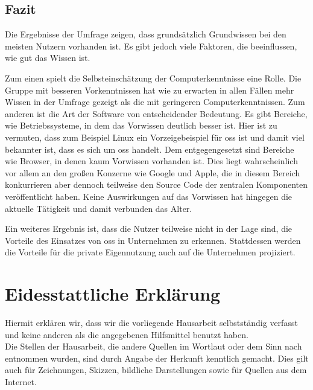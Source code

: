 \documentclass[a4paper]{article}
\begin{document}
        \subsection{Fazit}
            Die Ergebnisse der Umfrage zeigen, dass grundsätzlich Grundwissen bei den meisten Nutzern vorhanden ist. Es gibt jedoch viele Faktoren, die beeinflussen, wie gut das Wissen ist.
            
            Zum einen spielt die Selbsteinschätzung der Computerkenntnisse eine Rolle. Die Gruppe mit besseren Vorkenntnissen hat wie zu erwarten in allen Fällen mehr Wissen in der Umfrage gezeigt als die mit geringeren Computerkenntnissen.
            Zum anderen ist die Art der Software von entscheidender Bedeutung. Es gibt Bereiche, wie Betriebssysteme, in dem das Vorwissen deutlich besser ist. Hier ist zu vermuten, dass zum Beispiel Linux ein Vorzeigebeispiel für \gls{oss} ist und damit viel bekannter ist, dass es sich um \gls{oss} handelt. Dem entgegengesetzt sind Bereiche wie Browser, in denen kaum Vorwissen vorhanden ist. Dies liegt wahrscheinlich vor allem an den großen Konzerne wie Google und Apple, die in diesem Bereich konkurrieren aber dennoch teilweise den Source Code der zentralen Komponenten veröffentlicht haben.
            Keine Auswirkungen auf das Vorwissen hat hingegen die aktuelle Tätigkeit und damit verbunden das Alter.
            
            Ein weiteres Ergebnis ist, dass die Nutzer teilweise nicht in der Lage sind, die Vorteile des Einsatzes von \gls{oss} in Unternehmen zu erkennen. Stattdessen werden die Vorteile für die private Eigennutzung auch auf die Unternehmen projiziert.
                
    \clearpage
    \section{Eidesstattliche Erklärung}
        Hiermit erklären wir, dass wir die vorliegende Hausarbeit selbstständig verfasst und keine anderen als die angegebenen Hilfsmittel benutzt haben.\\
        Die Stellen der Hausarbeit, die andere Quellen im Wortlaut oder dem Sinn nach entnommen wurden, sind durch Angabe der Herkunft kenntlich gemacht. Dies gilt auch für Zeichnungen, Skizzen, bildliche Darstellungen sowie für Quellen aus dem Internet.
        
\end{document}
